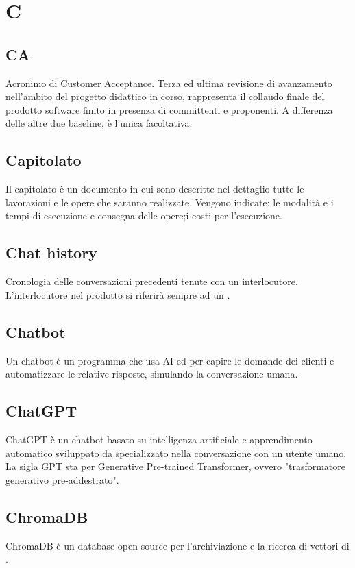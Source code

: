 \chapter{C}

\section{CA}\label{sec:Customer Acceptance}
Acronimo di Customer Acceptance. Terza ed ultima revisione di avanzamento nell'ambito del progetto didattico in corso, rappresenta il collaudo finale del prodotto software finito in presenza di committenti e proponenti. A differenza delle altre due baseline, è l'unica facoltativa.

\section{Capitolato}\label{sec:Capitolati}
Il capitolato è un documento in cui sono descritte nel dettaglio tutte le lavorazioni e le opere che saranno realizzate. Vengono indicate: le modalità e i tempi di esecuzione e consegna delle opere;i costi per l'esecuzione.

\section{Chat history}
Cronologia delle conversazioni precedenti tenute con un interlocutore. L'interlocutore nel prodotto si riferirà sempre ad un .

\section{Chatbot}
Un chatbot è un programma che usa AI ed  per capire le domande dei clienti e automatizzare le relative risposte, simulando la conversazione umana.

\section{ChatGPT}
ChatGPT è un chatbot basato su intelligenza artificiale e apprendimento automatico sviluppato da  specializzato nella conversazione con un utente umano. La sigla GPT sta per Generative Pre-trained Transformer, ovvero "trasformatore generativo pre-addestrato". 

\section{ChromaDB}\label{sec:Chroma}
ChromaDB è un database open source per l'archiviazione e la ricerca di vettori di .

